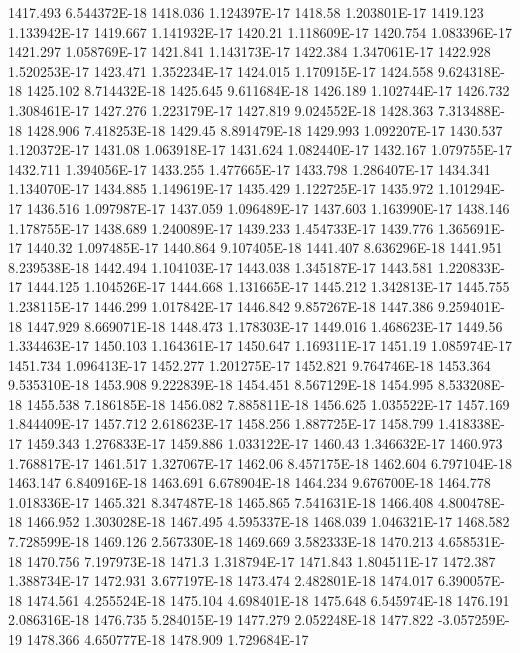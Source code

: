1417.493  6.544372E-18
1418.036  1.124397E-17
1418.58  1.203801E-17
1419.123  1.133942E-17
1419.667  1.141932E-17
1420.21  1.118609E-17
1420.754  1.083396E-17
1421.297  1.058769E-17
1421.841  1.143173E-17
1422.384  1.347061E-17
1422.928  1.520253E-17
1423.471  1.352234E-17
1424.015  1.170915E-17
1424.558  9.624318E-18
1425.102  8.714432E-18
1425.645  9.611684E-18
1426.189  1.102744E-17
1426.732  1.308461E-17
1427.276  1.223179E-17
1427.819  9.024552E-18
1428.363  7.313488E-18
1428.906  7.418253E-18
1429.45  8.891479E-18
1429.993  1.092207E-17
1430.537  1.120372E-17
1431.08  1.063918E-17
1431.624  1.082440E-17
1432.167  1.079755E-17
1432.711  1.394056E-17
1433.255  1.477665E-17
1433.798  1.286407E-17
1434.341  1.134070E-17
1434.885  1.149619E-17
1435.429  1.122725E-17
1435.972  1.101294E-17
1436.516  1.097987E-17
1437.059  1.096489E-17
1437.603  1.163990E-17
1438.146  1.178755E-17
1438.689  1.240089E-17
1439.233  1.454733E-17
1439.776  1.365691E-17
1440.32  1.097485E-17
1440.864  9.107405E-18
1441.407  8.636296E-18
1441.951  8.239538E-18
1442.494  1.104103E-17
1443.038  1.345187E-17
1443.581  1.220833E-17
1444.125  1.104526E-17
1444.668  1.131665E-17
1445.212  1.342813E-17
1445.755  1.238115E-17
1446.299  1.017842E-17
1446.842  9.857267E-18
1447.386  9.259401E-18
1447.929  8.669071E-18
1448.473  1.178303E-17
1449.016  1.468623E-17
1449.56  1.334463E-17
1450.103  1.164361E-17
1450.647  1.169311E-17
1451.19  1.085974E-17
1451.734  1.096413E-17
1452.277  1.201275E-17
1452.821  9.764746E-18
1453.364  9.535310E-18
1453.908  9.222839E-18
1454.451  8.567129E-18
1454.995  8.533208E-18
1455.538  7.186185E-18
1456.082  7.885811E-18
1456.625  1.035522E-17
1457.169  1.844409E-17
1457.712  2.618623E-17
1458.256  1.887725E-17
1458.799  1.418338E-17
1459.343  1.276833E-17
1459.886  1.033122E-17
1460.43  1.346632E-17
1460.973  1.768817E-17
1461.517  1.327067E-17
1462.06  8.457175E-18
1462.604  6.797104E-18
1463.147  6.840916E-18
1463.691  6.678904E-18
1464.234  9.676700E-18
1464.778  1.018336E-17
1465.321  8.347487E-18
1465.865  7.541631E-18
1466.408  4.800478E-18
1466.952  1.303028E-18
1467.495  4.595337E-18
1468.039  1.046321E-17
1468.582  7.728599E-18
1469.126  2.567330E-18
1469.669  3.582333E-18
1470.213  4.658531E-18
1470.756  7.197973E-18
1471.3  1.318794E-17
1471.843  1.804511E-17
1472.387  1.388734E-17
1472.931  3.677197E-18
1473.474  2.482801E-18
1474.017  6.390057E-18
1474.561  4.255524E-18
1475.104  4.698401E-18
1475.648  6.545974E-18
1476.191  2.086316E-18
1476.735  5.284015E-19
1477.279  2.052248E-18
1477.822  -3.057259E-19
1478.366  4.650777E-18
1478.909  1.729684E-17
